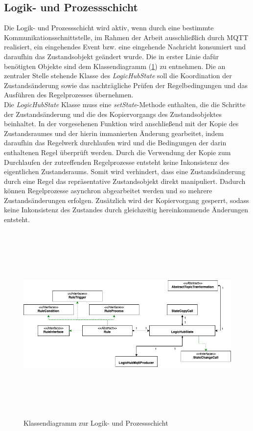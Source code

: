     \subsection{Logik- und Prozessschicht}
    \label{subsec:logikschicht}
    Die Logik- und Prozessschicht wird aktiv, wenn durch eine bestimmte Kommunikationsschnittstelle, im Rahmen der Arbeit ausschließlich durch \acs{MQTT} realisiert, ein eingehendes 
    Event bzw. eine eingehende Nachricht konsumiert und daraufhin das Zustandsobjekt geändert wurde. Die in erster Linie dafür benötigten Objekte sind dem 
    Klassendiagramm (\ref{fig:patternlogik}) zu entnehmen. Die an zentraler Stelle stehende Klasse des \textit{LogicHubState} soll die Koordination 
    der Zustandsänderung sowie das nachträgliche Prüfen der Regelbedingungen und das Ausführen des Regelprozesses übernehmen. 
    \\
    Die \textit{LogicHubState} Klasse muss eine \textit{setState}-Methode enthalten, die die Schritte der Zustandsänderung und die des Kopiervorgangs des Zustandsobjektes beinhaltet. 
    In der vorgesehenen Funktion wird anschließend mit der Kopie des Zustandsraumes und der hierin immanierten Änderung gearbeitet, indem daraufhin das Regelwerk durchlaufen wird und die Bedingungen 
    der darin enthaltenen Regel überprüft werden. Durch die Verwendung der Kopie zum Durchlaufen der zutreffenden Regelprozesse entsteht keine Inkonsistenz des eigentlichen Zustandsraums.  
    Somit wird verhindert, dass eine Zustandsänderung durch eine Regel das repräsentative Zustandsobjekt direkt manipuliert. Dadurch können Regelprozesse asynchron abgearbeitet werden 
    und so mehrere Zustandsänderungen erfolgen. Zusätzlich wird der Kopiervorgang gesperrt, sodass keine Inkonsistenz des Zustandes durch gleichzeitig hereinkommende Änderungen entsteht. 
    \begin{figure}[hbt!]
        \centering
        \includegraphics[width=14cm,height=10cm,keepaspectratio]{images/Logikschicht_final.png}
        \caption{Klassendiagramm zur Logik- und Prozessschicht}
        \label{fig:patternlogik}
    \end{figure}
